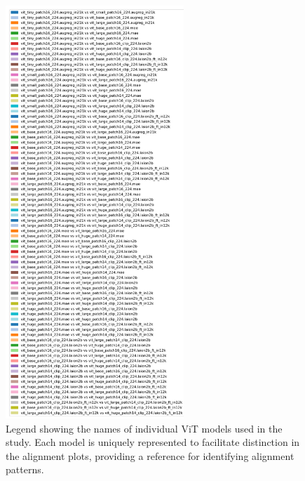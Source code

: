 \documentclass[10pt,a4paper]{article}
\begin{document}
\begin{figure}[H]
    \centering
    \includegraphics[width=0.6\textwidth, keepaspectratio]{legend_models.png}
    \caption{Legend showing the names of individual ViT models used in the study. Each model is uniquely represented to facilitate distinction in the alignment plots, providing a reference for identifying alignment patterns.}
    \label{fig:legend_models}
\end{figure}
\end{document}
